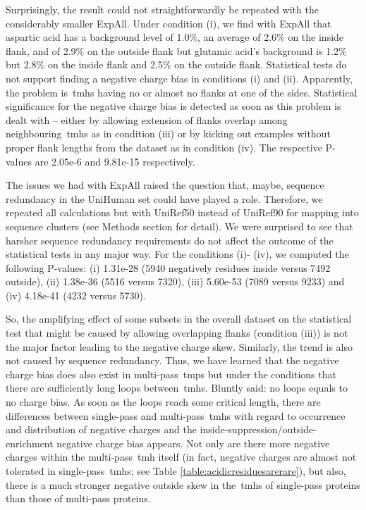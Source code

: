 Surprisingly, the result could not straightforwardly be repeated with the considerably smaller ExpAll.
Under condition (i), we find with ExpAll that aspartic acid has a background level of 1.0\%, an average of 2.6\% on the inside flank, and of 2.9\% on the outside flank but glutamic acid’s background is 1.2\% but 2.8\% on the inside flank and 2.5\% on the outside flank.
Statistical tests do not support finding a negative charge bias in conditions (i) and (ii).
Apparently, the problem is~\gls{tmh}s having no or almost no flanks at one of the sides.
Statistical significance for the negative charge bias is detected as soon as this problem is dealt with – either by allowing extension of flanks overlap among neighbouring~\gls{tmh}s as in condition (iii) or by kicking out examples without proper flank lengths from the dataset as in condition (iv).
The respective P-values are 2.05e-6 and 9.81e-15 respectively.

The issues we had with ExpAll raised the question that, maybe, sequence redundancy in the UniHuman set could have played a role.
Therefore, we repeated all calculations but with UniRef50 instead of UniRef90 for mapping into sequence clusters (see Methods section for detail).
We were surprised to see that harsher sequence redundancy requirements do not affect the outcome of the statistical tests in any major way.
For the conditions (i)- (iv), we computed the following P-values: (i) 1.31e-28 (5940 negatively residues inside versus 7492 outside), (ii) 1.38e-36 (5516 versus 7320), (iii) 5.60e-53 (7089 versus 9233) and (iv) 4.18e-41 (4232 versus 5730).

So, the amplifying effect of some subsets in the overall dataset on the statistical test that might be caused by allowing overlapping flanks (condition (iii)) is not the major factor leading to the negative charge skew.
Similarly, the trend is also not caused by sequence redundancy.
Thus, we have learned that the negative charge bias does also exist in multi-pass~\gls{tmp}s but under the conditions that there are sufficiently long loops between~\gls{tmh}s.
Bluntly said: no loops equals to no charge bias.
As soon as the loops reach some critical length, there are differences between single-pass and multi-pass~\gls{tmh}s with regard to occurrence and distribution of negative charges and the inside-suppression/outside-enrichment negative charge bias appears.
Not only are there more negative charges within the multi-pass~\gls{tmh} itself (in fact, negative charges are almost not tolerated in single-pass~\gls{tmh}s; see Table \ref{table:acidicresiduesarerare}), but also, there is a much stronger negative outside skew in the~\gls{tmh}s of single-pass proteins than those of multi-pass proteins.

